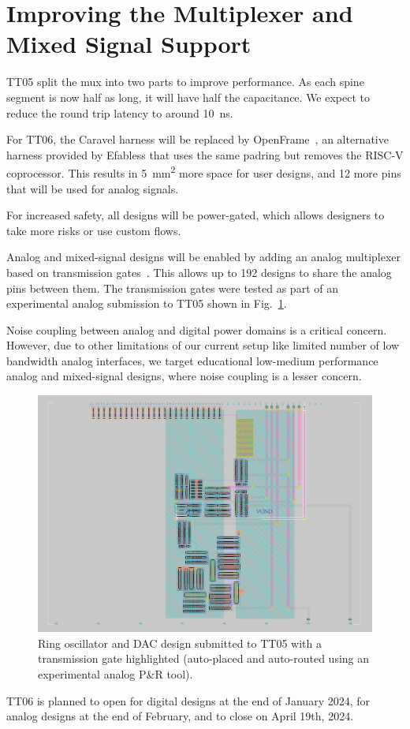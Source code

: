 \section{Improving the Multiplexer and Mixed Signal Support}
\label{sec:improving}

TT05 split the mux into two parts to improve performance.
As each spine segment is now half as long, it will have half the capacitance.
We expect to reduce the round trip latency to around \qty{10}{\ns}.

For TT06, the Caravel harness will be replaced by OpenFrame~\cite{openframe}, an alternative harness provided by Efabless that uses the same padring but removes the RISC-V coprocessor.
This results in \qty{5}{\mm\squared} more space for user designs, and 12 more pins that will be used for analog signals.

For increased safety, all designs will be power-gated, which allows designers to take more risks or use custom flows.

Analog and mixed-signal designs will be enabled by adding an analog multiplexer based on transmission gates~\cite{transmissiongates}. 
This allows up to 192 designs to share the analog pins between them.
The transmission gates were tested as part of an experimental analog submission to TT05 shown in Fig.~\ref{fig:transmission_gate_TT05}.

Noise coupling between analog and digital power domains is a critical concern. However, due to other limitations of our current setup like limited number of low bandwidth analog interfaces, we target educational low-medium performance analog and mixed-signal designs, where noise coupling is a lesser concern.

\begin{figure}[!t]
\centering
\includegraphics[width=\columnwidth]{./Figs/tt05_transmission_gate.png}
\caption{Ring oscillator and DAC design submitted to TT05 with a transmission gate highlighted (auto-placed and auto-routed using an experimental analog P\&R tool).}
\label{fig:transmission_gate_TT05}
\end{figure}

TT06 is planned to open for digital designs at the end of January 2024, for analog designs at the end of February, and to close on April 19th, 2024.
